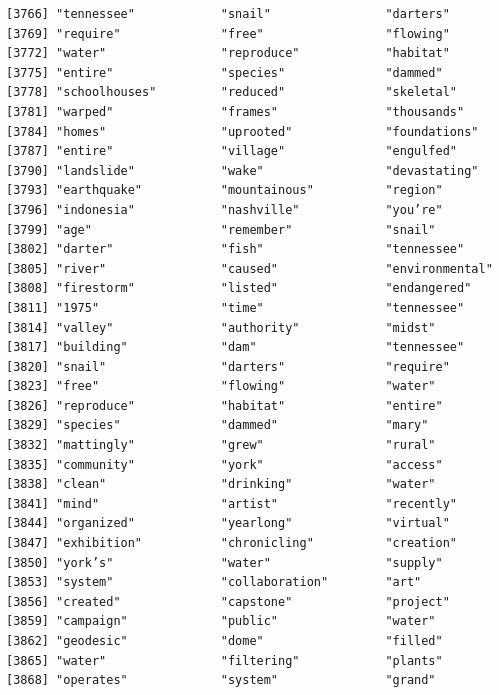 \documentclass[
  letterpaper,
  DIV=11,
  numbers=noendperiod]{scrartcl}
\begin{document}
\begin{verbatim}
[3766] "tennessee"            "snail"                "darters"             
[3769] "require"              "free"                 "flowing"             
[3772] "water"                "reproduce"            "habitat"             
[3775] "entire"               "species"              "dammed"              
[3778] "schoolhouses"         "reduced"              "skeletal"            
[3781] "warped"               "frames"               "thousands"           
[3784] "homes"                "uprooted"             "foundations"         
[3787] "entire"               "village"              "engulfed"            
[3790] "landslide"            "wake"                 "devastating"         
[3793] "earthquake"           "mountainous"          "region"              
[3796] "indonesia"            "nashville"            "you’re"              
[3799] "age"                  "remember"             "snail"               
[3802] "darter"               "fish"                 "tennessee"           
[3805] "river"                "caused"               "environmental"       
[3808] "firestorm"            "listed"               "endangered"          
[3811] "1975"                 "time"                 "tennessee"           
[3814] "valley"               "authority"            "midst"               
[3817] "building"             "dam"                  "tennessee"           
[3820] "snail"                "darters"              "require"             
[3823] "free"                 "flowing"              "water"               
[3826] "reproduce"            "habitat"              "entire"              
[3829] "species"              "dammed"               "mary"                
[3832] "mattingly"            "grew"                 "rural"               
[3835] "community"            "york"                 "access"              
[3838] "clean"                "drinking"             "water"               
[3841] "mind"                 "artist"               "recently"            
[3844] "organized"            "yearlong"             "virtual"             
[3847] "exhibition"           "chronicling"          "creation"            
[3850] "york’s"               "water"                "supply"              
[3853] "system"               "collaboration"        "art"                 
[3856] "created"              "capstone"             "project"             
[3859] "campaign"             "public"               "water"               
[3862] "geodesic"             "dome"                 "filled"              
[3865] "water"                "filtering"            "plants"              
[3868] "operates"             "system"               "grand"               

\end{verbatim}
\end{document}
